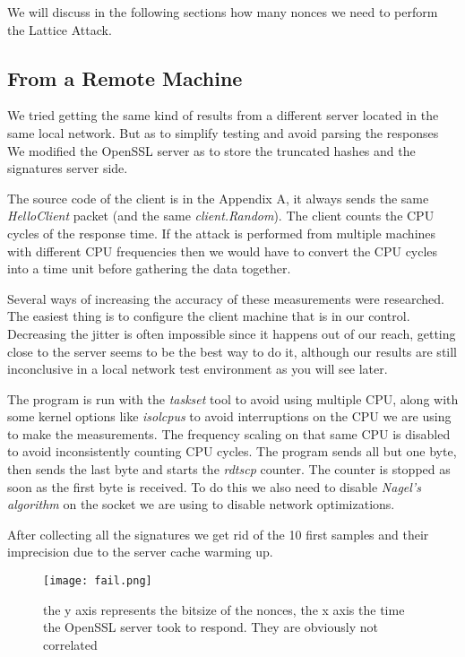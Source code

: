 \documentclass[a4paper,11pt]{article}
\begin{document}
We will discuss in the following sections how many nonces we need to perform the Lattice Attack.


\subsection{From a Remote Machine}

We tried getting the same kind of results from a different server located in the same local network. But as to simplify testing and avoid parsing the responses We modified the OpenSSL server as to store the truncated hashes and the signatures server side.

The source code of the client is in the Appendix A, it always sends the same \textit{HelloClient} packet (and the same \textit{client.Random}). The client counts the CPU cycles of the response time. If the attack is performed from multiple machines with different CPU frequencies then we would have to convert the CPU cycles into a time unit before gathering the data together.

Several ways of increasing the accuracy of these measurements were researched. The easiest thing is to configure the client machine that is in our control. Decreasing the jitter is often impossible since it happens out of our reach, getting close to the server seems to be the best way to do it, although our results are still inconclusive in a local network test environment as you will see later.

The program is run with the \textit{taskset} tool to avoid using multiple CPU, along with some kernel options like \textit{isolcpus} to avoid interruptions on the CPU we are using to make the measurements. The frequency scaling on that same CPU is disabled to avoid inconsistently counting CPU cycles. The program sends all but one byte, then sends the last byte and starts the \textit{rdtscp} counter. The counter is stopped as soon as the first byte is received. To do this we also need to disable \textit{Nagel's algorithm} on the socket we are using to disable network optimizations.

After collecting all the signatures we get rid of the 10 first samples and their imprecision due to the server cache warming up.

\begin{figure}[H]
\texttt{[image: fail.png]}
\caption{the y axis represents the bitsize of the nonces, the x axis the time the OpenSSL server took to respond. They are obviously not correlated}
\end{figure}
\end{document}
